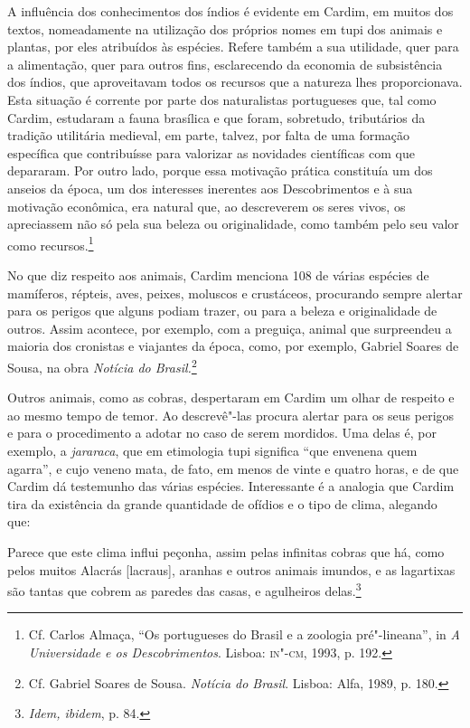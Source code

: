 A influência dos conhecimentos dos índios é evidente em Cardim, em
muitos dos textos, nomeadamente na utilização dos próprios nomes em
tupi dos animais e plantas, por eles atribuídos às espécies. Refere
também a sua utilidade, quer para a alimentação, quer para outros
fins, esclarecendo da economia de subsistência dos índios, que
aproveitavam todos os recursos que a natureza lhes proporcionava. Esta
situação é corrente por parte dos naturalistas portugueses que, tal
como Cardim, estudaram a fauna brasílica e que foram, sobretudo,
tributários da tradição utilitária medieval, em parte, talvez, por
falta de uma formação específica que contribuísse para valorizar as
novidades científicas com que depararam. Por outro lado, porque essa
motivação prática constituía um dos anseios da época, um dos interesses
inerentes aos Descobrimentos e à sua motivação econômica, era natural
que, ao descreverem os seres vivos, os apreciassem não só pela sua
beleza ou originalidade, como também pelo seu valor como
recursos.\footnote{ Cf. Carlos Almaça, ``Os portugueses do Brasil
e a zoologia pré"-lineana'', in \textit{A Universidade e os
Descobrimentos}. Lisboa: \textsc{in"-cm}, 1993, p. 192.} 

No que diz respeito aos animais, Cardim menciona 108 de
várias espécies de mamíferos, répteis, aves, peixes, moluscos e
crustáceos, procurando sempre alertar para os perigos que alguns podiam
trazer, ou para a beleza e originalidade de outros. Assim acontece, por
exemplo, com a preguiça, animal que surpreendeu a maioria dos cronistas
e viajantes da época, como, por exemplo, Gabriel Soares de Sousa, na
obra \textit{Notícia do Brasil.}\footnote{ Cf. Gabriel Soares de
Sousa. \textit{Notícia do Brasil}. Lisboa: Alfa, 1989, p. 180.}

 Outros animais, como as cobras, despertaram em Cardim um
olhar de respeito e ao mesmo tempo de temor. Ao descrevê"-las procura
alertar para os seus perigos e para o procedimento a adotar no caso de
serem mordidos. Uma delas é, por exemplo, a \textit{jararaca}, que em
etimologia tupi significa ``que envenena quem agarra'', e cujo veneno
mata, de fato, em menos de vinte e quatro horas, e de que Cardim dá
testemunho das várias espécies. Interessante é a analogia que Cardim
tira da existência da grande quantidade de ofídios e o tipo de clima,
alegando que:

\begin{hedraquote}
Parece que este clima influi peçonha, assim pelas infinitas
cobras que há, como pelos muitos Alacrás [lacraus], aranhas e outros
animais imundos, e as lagartixas são tantas que cobrem as paredes das
casas, e agulheiros delas.\footnote{ \textit{Idem, ibidem}, p. 84.}
\end{hedraquote}

